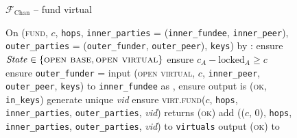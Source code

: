 \begin{figure}[H]
  \begin{systembox}{$\mathcal{F}_{\mathrm{Chan}}$ -- fund virtual}
    \begin{algorithmic}[1]
      \State On (\textsc{fund}, $c$, \texttt{hops}, \texttt{inner\_parties} =
      (\texttt{inner\_fundee}, \texttt{inner\_peer}), \texttt{outer\_parties} =
      (\texttt{outer\_funder}, \texttt{outer\_peer}), \texttt{keys}) by \alice:
      \label{code:functionality:chan:skeleton:virtual:fund}
      \Indent
        \State ensure $\mathit{State} \in \{\textsc{open base}, \textsc{open
        virtual}\}$
        \State ensure $c_A - \mathrm{locked}_A \geq c$
        \State ensure \texttt{outer\_funder} = \alice
        \State input (\textsc{open virtual}, $c$, \texttt{inner\_peer},
        \texttt{outer\_peer}, \texttt{keys}) to \texttt{inner\_fundee} as
        \alice, ensure output is (\textsc{ok}, \texttt{in\_keys})
        \label{code:functionality:chan:skeleton:virtual:subfunc}
        \State generate unique \textit{vid}
        \label{code:functionality:chan:skeleton:virtual:id}
        \State ensure \textsc{virt.fund}($c$, \texttt{hops},
        \texttt{inner\_parties}, \texttt{outer\_parties}, \textit{vid}) returns
        (\textsc{ok})
        \label{code:functionality:chan:skeleton:virtual:fund:virt}
        \State add (($c$, 0), \texttt{hops}, \texttt{inner\_parties},
        \texttt{outer\_parties}, \textit{vid}) to \texttt{virtuals}
        \label{code:functionality:chan:skeleton:virtual:fund:store}
        \State output (\textsc{ok}) to \alice
      \EndIndent
    \end{algorithmic}
  \end{systembox}
  \caption{}
  \label{code:functionality:chan:skeleton:virtual:fund:fig}
\end{figure}


